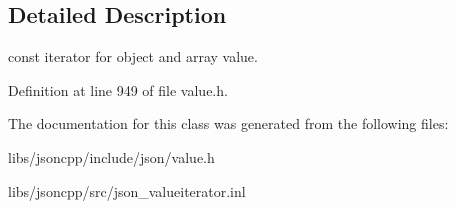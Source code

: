 \subsection{Detailed Description}
const iterator for object and array value. 

\begin{DoxyVerb} \end{DoxyVerb}
 

Definition at line 949 of file value.\-h.



The documentation for this class was generated from the following files\-:\begin{DoxyCompactItemize}
\item 
libs/jsoncpp/include/json/value.\-h\item 
libs/jsoncpp/src/json\-\_\-valueiterator.\-inl\end{DoxyCompactItemize}
